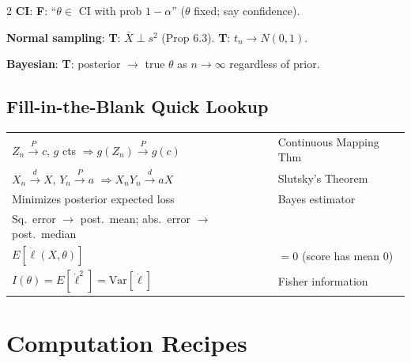 \documentclass[8pt]{extarticle}
\begin{document}
\begin{multicols}{2}
\textbf{CI}: \textbf{F}: ``$\theta \in$ CI with prob $1{-}\alpha$'' ($\theta$ fixed; say confidence).

\textbf{Normal sampling}: \textbf{T}: $\bar X \perp s^2$ (Prop 6.3). \; \textbf{T}: $t_n \to N(0,1)$.

\textbf{Bayesian}: \textbf{T}: posterior $\to$ true $\theta$ as $n\to\infty$ regardless of prior.

\subsection{Fill-in-the-Blank Quick Lookup}

\begin{tabular}{@{}ll@{}}
$Z_n \xrightarrow{P} c$, $g$ cts $\Rightarrow g(Z_n)\xrightarrow{P}g(c)$ & Continuous Mapping Thm \\
$X_n\xrightarrow{d}X$, $Y_n\xrightarrow{P}a$ $\Rightarrow X_nY_n\xrightarrow{d}aX$ & Slutsky's Theorem \\
Minimizes posterior expected loss & Bayes estimator \\
Sq.\ error $\to$ post.\ mean; abs.\ error $\to$ post.\ median & \\
$E[\dot\ell(X,\theta)]$ & $= 0$ (score has mean 0) \\
$I(\theta) = E[\dot\ell^2] = \text{Var}[\dot\ell]$ & Fisher information \\
\end{tabular}

\section{Computation Recipes}


\end{multicols}
\end{document}
